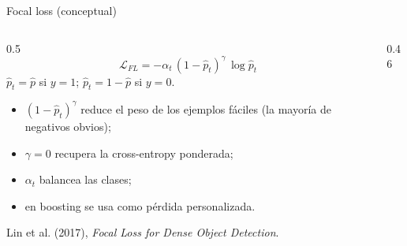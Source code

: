 \documentclass[aspectratio=169,12pt]{beamer}
\begin{document}
\begin{frame}{Focal loss (conceptual)}
  \begin{columns}[c]
    \begin{column}{0.5\textwidth}
      \[ \mathcal{L}_{FL} = -\alpha_t\,(1 - \hat{p}_t)^{\gamma}\,\log \hat{p}_t \]
      \small $\hat{p}_t = \hat{p}$ si $y = 1$; $\hat{p}_t = 1 - \hat{p}$ si $y = 0$.
      \begin{itemize}
        \item $(1 - \hat{p}_t)^\gamma$ reduce el peso de los ejemplos fáciles (la mayoría de negativos obvios);
        \item $\gamma = 0$ recupera la cross-entropy ponderada;
        \item $\alpha_t$ balancea las clases;
        \item en boosting se usa como pérdida personalizada.
      \end{itemize}
      {\tiny Lin et al. (2017), \emph{Focal Loss for Dense Object Detection}.}
    \end{column}
    \begin{column}{0.46\textwidth}
      \centering
    \end{column}
  \end{columns}
\end{frame}
\end{document}
